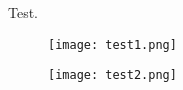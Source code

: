 \documentclass{article}
\begin{document}
Test.


\begin{figure}
\texttt{[image: test1.png]}
\end{figure}

\begin{figure}
\texttt{[image: test2.png]}
\label{fig:test2}
\end{figure}
\end{document}
